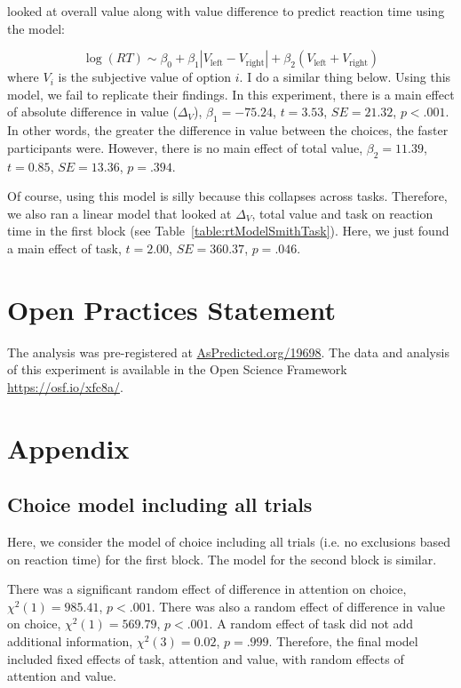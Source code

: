 \documentclass[12pt]{article}
\begin{document}
 looked at overall value along with value difference to predict reaction time using the model:

\begin{equation}
	\log(RT) \sim \beta_0 + \beta_1|V_\text{left} - V_\text{right}| + \beta_2(V_\text{left} + V_\text{right})
\end{equation}
where $V_i$ is the subjective value of option $i$. I do a similar thing below. Using this model, we fail to replicate their findings. In this experiment, there is a main effect of absolute difference in value ($\Delta_V$), $\beta_1=-75.24$, $t=3.53$, $SE=21.32$, $p<.001$. In other words, the greater the difference in value between the choices, the faster participants were. However, there is no main effect of total value, $\beta_2=11.39$, $t=0.85$, $SE=13.36$, $p=.394$.



Of course, using this model is silly because this collapses across tasks. Therefore, we also ran a linear model that looked at $\Delta_V$, total value and task on reaction time in the first block (see Table~\ref{table:rtModelSmithTask}). Here, we just found a main effect of task, $t=2.00$, $SE=360.37$, $p=.046$.


\clearpage
\section{Open Practices Statement}
The analysis was pre-registered at \url{AsPredicted.org/19698}. The data and analysis of this experiment is available in the Open Science Framework \url{https://osf.io/xfc8a/}. 




\clearpage
\section{Appendix}
\subsection{Choice model including all trials}
Here, we consider the model of choice including all trials (i.e. no exclusions based on reaction time) for the first block. The model for the second block is similar. 

There was a significant random effect of difference in attention on choice, $\chi^2(1)=985.41$, $p<.001$. There was also a random effect of difference in value on choice, $\chi^2(1)=569.79$, $p<.001$. A random effect of task did not add additional information, $\chi^2(3)=0.02$, $p=.999$. Therefore, the final model included fixed effects of task, attention and value, with random effects of attention and value.
\end{document}
